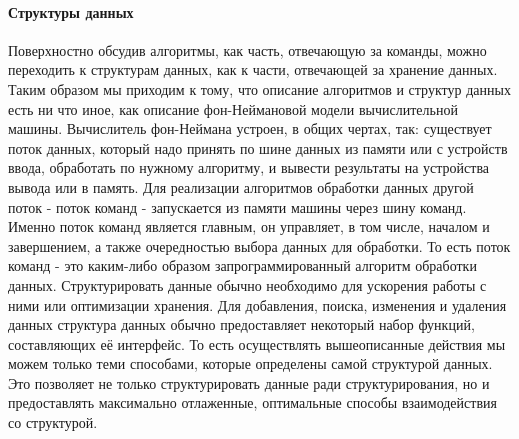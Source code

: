 \documentclass[fontsize=14bp]{report}
\begin{document}
\paragraph{Структуры данных}
Поверхностно обсудив алгоритмы, как часть, отвечающую за команды, можно переходить к структурам данных, как к части, отвечающей за хранение данных. Таким образом мы приходим к тому, что описание алгоритмов и структур данных есть ни что иное, как описание фон-Неймановой модели вычислительной машины. Вычислитель фон-Неймана устроен, в общих чертах, так: существует поток данных, который надо принять по шине данных из памяти или с устройств ввода, обработать по нужному алгоритму, и вывести результаты на устройства вывода или в память. Для реализации алгоритмов обработки данных другой поток - поток команд - запускается из памяти машины через шину команд. Именно поток команд является главным, он управляет, в том числе, началом и завершением, а также очередностью выбора данных для обработки. То есть поток команд - это каким-либо образом запрограммированный алгоритм обработки данных.
Структурировать данные обычно необходимо для ускорения работы с ними или оптимизации хранения. Для добавления, поиска, изменения и удаления данных структура данных обычно предоставляет некоторый набор функций, составляющих её интерфейс. То есть осуществлять вышеописанные действия мы можем только теми способами, которые определены самой структурой данных. Это позволяет не только структурировать данные ради структурирования, но и предоставлять максимально отлаженные, оптимальные способы взаимодействия со структурой.
\end{document}
